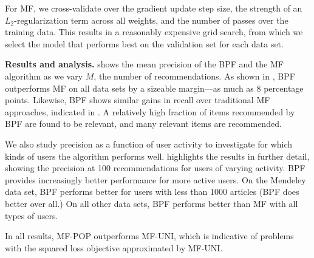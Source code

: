 For MF, we cross-validate over the gradient update step size, the
strength of an $L_2$-regularization term across all weights, and the
number of passes over the training data. This results in a reasonably
expensive grid search, from which we select
the model that performs best on the validation set for each data set.



{\bf Results and analysis.}  shows the mean
precision of the BPF and the MF algorithm as we vary $M$, the number
of recommendations. As shown in , BPF
outperforms MF on all data sets by a sizeable margin---as much as 8
percentage points. Likewise, BPF shows similar gains in recall over
traditional MF approaches, indicated in . A
relatively high fraction of items recommended by BPF are found to be
relevant, and many relevant items are recommended.

We also study precision as a function of user activity to investigate
for which kinds of users the algorithm performs
well.  highlights the results in
further detail, showing the precision at 100 recommendations for users
of varying activity. BPF provides increasingly better performance for
more active users.  On the Mendeley data set, BPF performs better for
users with less than 1000 articles (BPF does better over all.)  On all
other data sets, BPF performs better than MF with all types of users.

In all results, MF-POP outperforms MF-UNI, which is indicative of
problems with the squared loss objective approximated by MF-UNI.

